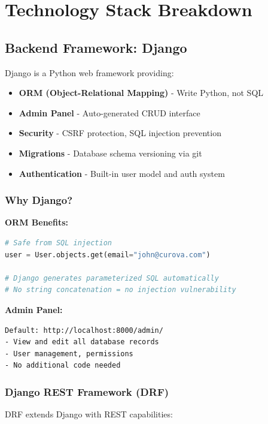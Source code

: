 \documentclass[11pt,a4paper,twoside]{report}
\begin{document}
\newpage

\chapter{Technology Stack Breakdown}

\section{Backend Framework: Django}

Django is a Python web framework providing:

\begin{itemize}
    \item \textbf{ORM (Object-Relational Mapping)} - Write Python, not SQL
    \item \textbf{Admin Panel} - Auto-generated CRUD interface
    \item \textbf{Security} - CSRF protection, SQL injection prevention
    \item \textbf{Migrations} - Database schema versioning via git
    \item \textbf{Authentication} - Built-in user model and auth system
\end{itemize}

\subsection{Why Django?}

\textbf{ORM Benefits:}
\begin{lstlisting}[language=Python]
# Safe from SQL injection
user = User.objects.get(email="john@curova.com")

# Django generates parameterized SQL automatically
# No string concatenation = no injection vulnerability
\end{lstlisting}

\textbf{Admin Panel:}
\begin{verbatim}
Default: http://localhost:8000/admin/
- View and edit all database records
- User management, permissions
- No additional code needed
\end{verbatim}

\subsection{Django REST Framework (DRF)}

DRF extends Django with REST capabilities:
\end{document}
